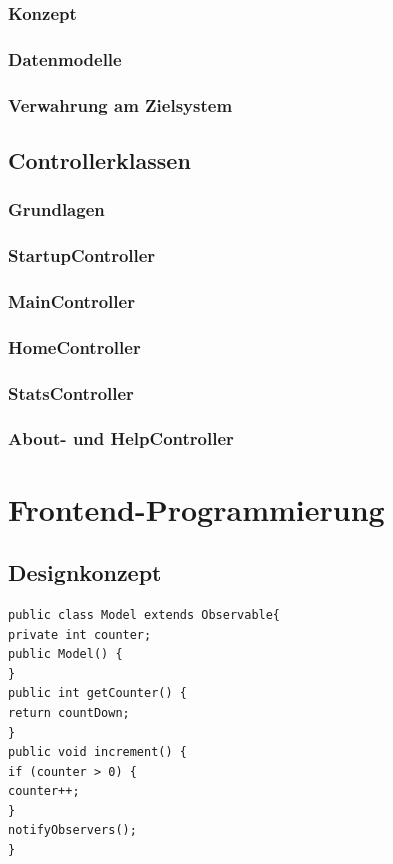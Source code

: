 \subsubsection{Konzept}
\subsubsection{Datenmodelle}
\subsubsection{Verwahrung am Zielsystem}

\subsection{Controllerklassen}
\subsubsection{Grundlagen}
\subsubsection{StartupController}
\subsubsection{MainController}
\subsubsection{HomeController}
\subsubsection{StatsController}
\subsubsection{About- und HelpController}


\section{Frontend-Programmierung}
\subsection{Designkonzept}



\begin{lstlisting}[style=java,caption=Java Codebeispiel,label=Model]
public class Model extends Observable{
private int counter;
public Model() {
}
public int getCounter() {
return countDown;
}
public void increment() {
if (counter > 0) {
counter++;
}
notifyObservers();
}
\end{lstlisting}


